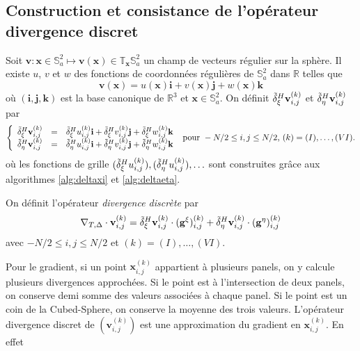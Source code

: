 \subsection{Construction et consistance de l'opérateur divergence discret}

Soit $\mathbf{v} : \mathbf{x} \in \mathbb{S}_a^2 \mapsto \mathbf{v}(\mathbf{x}) \in \mathbb{T}_{\mathbf{x}} \mathbb{S}_a^2$ un champ de vecteurs régulier sur la sphère. Il existe $u$, $v$ et $w$ des fonctions de coordonnées régulières de $\mathbb{S}_a^2$ dans $\mathbb{R}$ telles que
\begin{equation}
\mathbf{v}(\mathbf{x}) = u(\mathbf{x}) \mathbf{i} + v (\mathbf{x}) \mathbf{j} + w(\mathbf{x}) \mathbf{k}
\end{equation}
où $(\mathbf{i}, \mathbf{j}, \mathbf{k})$ est la base canonique de $\mathbb{R}^3$ et $\mathbf{x} \in \mathbb{S}_a^2$. On définit $\tilde{\delta}^H_{\xi} \mathbf{v}_{i,j}^{(k)}$ et $\tilde{\delta}^H_{\eta} \mathbf{v}_{i,j}^{(k)}$ par
\begin{equation}
\left\lbrace
\begin{array}{rcl}
\tilde{\delta}^H_{\xi} \mathbf{v}_{i,j}^{(k)} & = & \tilde{\delta}^H_{\xi} u_{i,j}^{(k)} \mathbf{i} + \tilde{\delta}^H_{\xi} v_{i,j}^{(k)} \mathbf{j} + \tilde{\delta}^H_{\xi} w_{i,j}^{(k)} \mathbf{k} \\
\tilde{\delta}^H_{\eta} \mathbf{v}_{i,j}^{(k)} & = & \tilde{\delta}^H_{\eta} u_{i,j}^{(k)} \mathbf{i} + \tilde{\delta}^H_{\eta} v_{i,j}^{(k)} \mathbf{j} + \tilde{\delta}^H_{\eta} w_{i,j}^{(k)} \mathbf{k}
\end{array}
\right.
\text{ pour } -N/2 \leq  i,j \leq N/2 \text{, } (k) = (I), \ldots, (VI). 
\label{eq:der_partiel_vect}
\end{equation}
où les fonctions de grille $(\tilde{\delta}^H_{\xi} u_{i,j}^{(k)}), (\tilde{\delta}^H_{\eta} u_{i,j}^{(k)}),  \ldots$ sont construites grâce aux algorithmes \ref{alg:deltaxi} et \ref{alg:deltaeta}.

\begin{definition}
On définit l'opérateur \textit{divergence discrète} par 
\begin{equation}
\nabla_{T,\Delta} \cdot \mathbf{v}_{i,j}^{(k)} = \tilde{\delta}^H_{\xi} \mathbf{v}_{i,j}^{(k)} \cdot ( \mathbf{g}^{\xi} )_{i,j}^{(k)} + \tilde{\delta}^H_{\eta} \mathbf{v}_{i,j}^{(k)} \cdot ( \mathbf{g}^{\eta} )_{i,j}^{(k)}
\end{equation}
avec $-N/2 \leq i,j \leq N/2$ et $(k) = (I), \ldots , (VI)$.
\label{def:divergence_disc}
\end{definition}
Pour le gradient, si un point $\mathbf{x}_{i,j}^{(k)}$ appartient à plusieurs panels, on y calcule plusieurs divergences approchées. Si le point est à l'intersection de deux panels, on conserve demi somme des valeurs associées à chaque panel. Si le point est un coin de la Cubed-Sphere, on conserve la moyenne des trois valeurs.
L'opérateur divergence discret de $(\mathbf{v}_{i,j}^{(k)})$ est une approximation du gradient en $\mathbf{x}_{i,j}^{(k)}$. En effet

